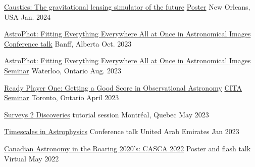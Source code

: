 \begin{cvhonors}
  \cvhonor
    {\href{https://ui.adsabs.harvard.edu/abs/2024AAS...24326120S/abstract}{Caustics: The gravitational lensing simulator of the future}} %
    {\href{https://aas.org/meetings/aas243}{Poster}} %
    {New Orleans, USA} %
    {Jan. 2024} %
    
  \cvhonor
    {\href{http://www.birs.ca/events/2023/5-day-workshops/23w5094/videos/watch/202311020908-Stone.html}{AstroPhot: Fitting Everything Everywhere All at Once in Astronomical Images}} %
    {\href{https://workshops.birs.ca/events/23w5094}{Conference talk}} %
    {Banff, Alberta} %
    {Oct. 2023} %

  \cvhonor
    {\href{https://uwaterloo.ca/astrophysics-centre/events/seminar-connor-stone}{AstroPhot: Fitting Everything Everywhere All at Once in Astronomical Images}} %
    {\href{https://uwaterloo.ca/astrophysics-centre/}{Seminar}} %
    {Waterloo, Ontario} %
    {Aug. 2023} %
    
  \cvhonor
    {\href{https://www.youtube.com/watch?v=AIsG8lN-R0I}{Ready Player One: Getting a Good Score in Observational Astronomy}} %
    {\href{https://www.cita.utoronto.ca/}{CITA Seminar}} %
    {Toronto, Ontario} %
    {April 2023} %

  \cvhonor
    {\href{https://www.s2dconference.com/}{Surveys 2 Discoveries}} %
    {tutorial session} %
    {Montr{\'e}al, Quebec} %
    {May 2023} %
    
  \cvhonor
    {\href{https://www.nyuadtimescales.com/}{Timescales in Astrophysics}} %
    {Conference talk} %
    {United Arab Emirates} %
    {Jan 2023} %
    
  \cvhonor
    {\href{https://uwaterloo.ca/canadian-astronomical-society/}{Canadian Astronomy in the Roaring 2020’s: CASCA 2022}} %
    {Poster and flash talk} %
    {Virtual} %
    {May 2022} %
    

\end{cvhonors}

